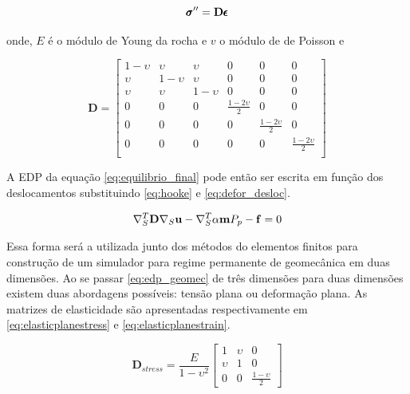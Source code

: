 \begin{equation}{
\label{eq:hooke}
\pmb{\sigma}^{\prime\prime}= \mathbf{D} \pmb{\epsilon}}
\end{equation}

onde, $E$ é o módulo de Young da rocha e $v$ o módulo de de Poisson e

\begin{equation}
    \mathbf{D} = \begin{bmatrix}
 1-\upsilon & \upsilon    &  \upsilon & 0 & 0 & 0  \\
 \upsilon   &  1-\upsilon &  \upsilon & 0 & 0 & 0  \\
  \upsilon & \upsilon   &  1-\upsilon &  0 & 0 & 0 \\
 0& 0& 0 & \frac{1-2\upsilon}{2} & 0 & 0    \\
 0& 0& 0 & 0 &\frac{1-2\upsilon}{2} & 0     \\
 0& 0& 0 & 0 & 0 &  \frac{1-2\upsilon}{2}     \\
 
\end{bmatrix}
\end{equation}



A EDP da equação \eqref{eq:equilibrio_final} pode então ser escrita em função dos deslocamentos substituindo \eqref{eq:hooke} e \eqref{eq:defor_desloc}.

\begin{equation}
\label{eq:edp_geomec}
\nabla_S^T \mathbf{D} \nabla_S \mathbf{u} - \nabla_S^T\alpha \mathbf{m} P_p - \mathbf{f} = 0
\end{equation}

 Essa forma será a utilizada junto dos métodos do elementos finitos para construção de um simulador para regime permanente de geomecânica em duas dimensões. Ao se passar \eqref{eq:edp_geomec} de três dimensões para duas dimensões existem duas abordagens possíveis: tensão plana ou deformação plana. As matrizes de elasticidade são apresentadas respectivamente em \eqref{eq:elasticplanestress} e \eqref{eq:elasticplanestrain}.

\begin{equation} \label{eq:elasticplanestress}
\mathbf{D}_{stress} = \frac{E}{1-\upsilon^2}
\begin{bmatrix}
1  & \upsilon & 0 \\
\upsilon & 1 &  0 \\
0 & 0 & \frac{1-\upsilon}{2}
\end{bmatrix}
\end{equation}

